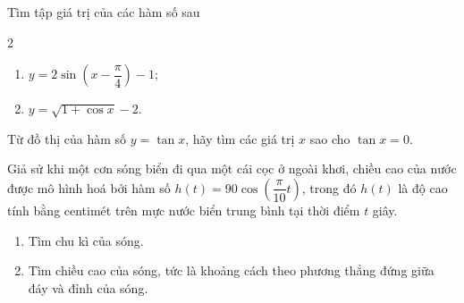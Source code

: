 \begin{bt}
\begin{bt}%
	Tìm tập giá trị của các hàm số sau
	\begin{multicols}{2}
		\begin{enumerate}
			\item   $y=2 \sin \left(x-\dfrac{\pi}{4}\right)-1$;
			\item   $y=\sqrt{1+\cos x}-2$.
		\end{enumerate}
	\end{multicols}
\end{bt}

\begin{bt}%
	Từ đồ thị của hàm số $y=\tan x$, hãy tìm các giá trị $x$ sao cho $\tan x=0$.
\end{bt}

\begin{bt}%
	Giả sử khi một cơn sóng biển đi qua một cái cọc ở ngoài khơi, chiều cao của nước được mô hình hoá bởi hàm số $h(t)=90 \cos \left(\dfrac{\pi}{10} t\right)$, trong đó $h(t)$ là độ cao tính bằng centimét trên mực nước biển trung bình tại thời điểm $t$ giây.
	\begin{enumerate}
		\item   Tìm chu kì của sóng.
		\item    Tìm chiều cao của sóng, tức là khoảng cách theo phương thẳng đứng giữa đáy và đỉnh của sóng.
	\end{enumerate}
\end{bt}

\end{bt}
